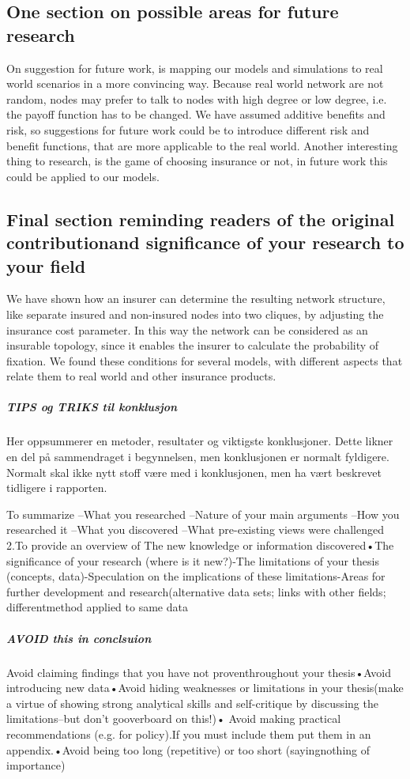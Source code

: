 \subsection{One section on possible areas for future research}
On suggestion for future work, is mapping our models and simulations to real world scenarios in a more convincing way. Because real world network are not random, nodes may prefer to talk to nodes with high degree or low degree, i.e. the payoff function has to be changed. We have assumed additive benefits and risk, so suggestions for future work could be to introduce different risk and benefit functions, that are more applicable to the real world. 
Another interesting thing to research, is the game of choosing insurance or not, in future work this could be applied to our models.
 
\subsection{Final section reminding readers of the original contributionand significance of your research to your field}
We have shown how an insurer can determine the resulting network structure, like separate insured and non-insured nodes into two cliques, by adjusting the insurance cost parameter. In this way the network can be considered as an insurable topology, since it enables the insurer to calculate the probability of fixation. 
We found these conditions for several models, with different aspects that relate them to real world and other insurance products.

\subparagraph{TIPS og TRIKS til konklusjon}
Her oppsummerer en metoder, resultater og viktigste konklusjoner. Dette likner en del på 
sammendraget i begynnelsen, men konklusjonen er normalt fyldigere. Normalt skal ikke nytt stoff 
være med i konklusjonen, men ha vært beskrevet tidligere i rapporten. 

To summarize
 –What you researched –Nature of your main arguments –How you researched it –What you discovered –What pre-existing views were challenged
2.To provide an overview of 
The new knowledge or information discovered•The significance of your research (where is it new?)-The limitations of your thesis (concepts, data)-Speculation on the implications of these limitations-Areas for further development and research(alternative data sets; links with other fields; differentmethod applied to same data
\subparagraph{AVOID this in conclsuion}
Avoid claiming findings that you have not proventhroughout your thesis•Avoid introducing new data•Avoid hiding weaknesses or limitations in your thesis(make a virtue of showing strong analytical skills and self-critique by discussing the limitations--but don’t gooverboard on this!)• Avoid making practical recommendations (e.g. for policy).If you must include them put them in an appendix.•Avoid being too long (repetitive) or too short (sayingnothing of importance)
